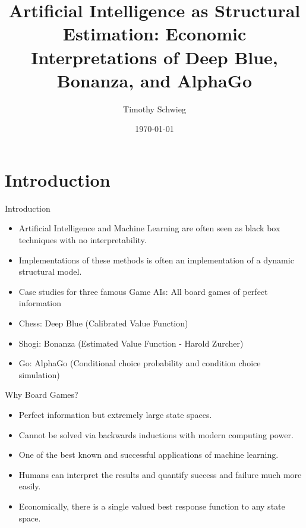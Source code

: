 \documentclass[presentation]{beamer}
\author{Timothy Schwieg}
\date{\today}
\title{Artificial Intelligence as Structural Estimation: Economic Interpretations of Deep Blue, Bonanza, and AlphaGo}
\begin{document}
\maketitle

\section{Introduction}
\label{sec:org0ce30ba}
\begin{frame}[label={sec:orga31e77b}]{Introduction}
\begin{itemize}
\item Artificial Intelligence and Machine Learning are often seen as black
box techniques with no interpretability.
\item Implementations of these methods is often an implementation of a
dynamic structural model.
\item Case studies for three famous Game AIs: All board games of perfect
information
\item Chess: Deep Blue (Calibrated Value Function)
\item Shogi: Bonanza (Estimated Value Function - Harold Zurcher)
\item Go: AlphaGo (Conditional choice probability and condition choice
simulation)
\end{itemize}
\end{frame}

\begin{frame}[label={sec:org8858491}]{Why Board Games?}
\begin{itemize}
\item Perfect information but extremely large state spaces.
\item Cannot be solved via backwards inductions with modern computing
power.
\item One of the best known and successful applications of machine
learning.
\item Humans can interpret the results and quantify success and failure
much more easily.
\item Economically, there is a single valued best response function to any
state space.
\end{itemize}
\end{frame}
\end{document}
